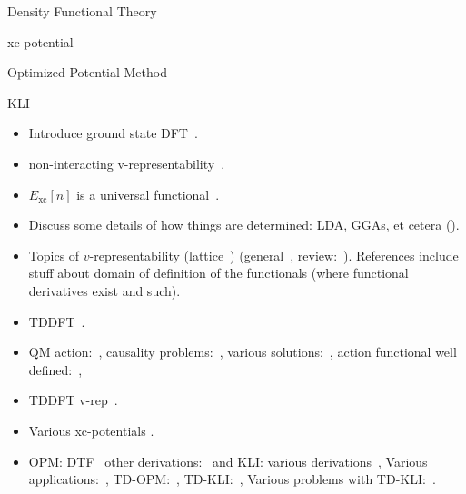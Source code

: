 \documentclass[letterpaper, 12 pt]{report}
\begin{document}
\begin{chapter}{Density Functional Theory \label{chap:dft}}
\begin{section}{xc-potential \label{sec:xcpot}}
      \begin{subsection}{Optimized Potential Method \label{sec:opm}}

      \end{subsection}

      \begin{subsection}{KLI \label{sec:kli}}

      \end{subsection}

   \end{section}

   \begin{itemize}

      \item Introduce ground state DFT~\cite[p. 61]{dft-engel}.

      \item non-interacting v-representability~\cite{nonint1, nonint2}.

      \item $E_\mathrm{xc}[n]$ is a universal functional~\cite{dft-engel}.

      \item Discuss some details of how things are determined: LDA, GGAs, et cetera
         ({\color{red}{still need this}}).

      \item Topics of $v$-representability (lattice~\cite{vrep-lat}) (general~\cite{vrep-levy1,
         vrep-levy2, vrep-lieb}, review:~\cite{vrep-rev}). References include stuff about domain of
         definition of the functionals (where functional derivatives exist and such).

      \item TDDFT~\cite{rgt, tddft, marques-1}.

      \item QM action:~\cite{qmaction}, causality problems:~\cite{tddft-causality},
         various solutions:~\cite{caus-sol1, caus-sol2}, action functional well
         defined:~\cite{td-welldef}, 

      \item TDDFT v-rep~\cite{td-vrep}.

      \item Various xc-potentials {\color{red}{Add some refs?}}.

      \item OPM: DTF~\cite{opm1, opm2} other derivations:~\cite{opm3, opm4, opm5, opm-rev} and
         KLI: various derivations~\cite{kli1, kli2, kli3},
         Various applications:~\cite[p. 254]{dft-engel},
         TD-OPM:~\cite{tdopm}, TD-KLI:~\cite{tdkli1, tdkli2, tdkli3}, Various problems with
         TD-KLI:~\cite[p. 134-135]{tddft}.

   \end{itemize}

\end{chapter}
\end{document}
